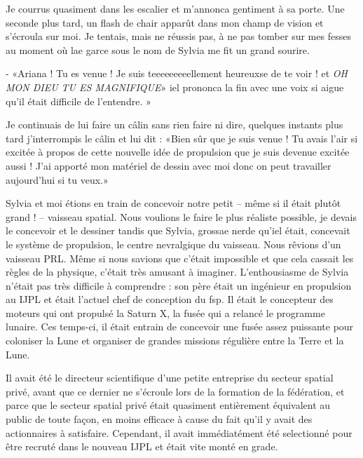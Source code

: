 \documentclass[12pt,hidelinks,a4paper]{book}
\renewcommand{\cdot}{\textbullet}
\begin{document}
\bigskip

Je courrus quasiment dans les escalier et m'annonca gentiment à sa
porte. Une seconde plus tard, un flash de chair apparût dans mon champ
de vision et s'écroula sur moi. Je tentais, mais ne réussis pas, à
ne pas tomber sur mes fesses au moment où lae garce sous le nom de
Sylvia me fit un grand sourire.\par

\bigskip

- «Ariana ! Tu es venue ! Je suis teeeeeeeeellement heureux\cdot se de
te voir ! et \textit{OH MON DIEU TU ES MAGNIFIQUE}» iel prononca
la fin avec une voix si aigue qu'il était difficile de l'entendre.
»

\bigskip

Je continuais de lui faire un câlin sans rien faire ni dire, quelques
instants plus tard j'interrompis le câlin et lui dit : «Bien sûr
que je suis venue ! Tu avais l'air si excité\cdot e à propos de cette nouvelle
idée de propulsion que je suis devenue excitée aussi ! J'ai apporté
mon matériel de dessin avec moi donc on peut travailler aujourd'hui
si tu veux.»

\bigskip

Sylvia et moi étions en train de concevoir notre petit -- même si
il était plutôt grand ! -- vaisseau spatial. Nous voulions le faire
le plus réaliste possible, je devais le concevoir et le dessiner tandis
que Sylvia, grossae nerd\cdot e qu'iel était, concevait le système de propulsion,
le centre nevralgique du vaisseau. Nous rêvions d'un vaisseau PRL.
Même si nous savions que c'était impossible et que cela cassait les
règles de la physique, c'était très amusant à imaginer. L'enthousiasme
de Sylvia n'était pas très difficile à comprendre : son père était
un ingénieur en propulsion au IJPL et était l'actuel chef de conception
du \gls{fsp}. Il était le concepteur des moteurs qui ont propulsé
la Saturn X, la fusée qui a relancé le programme lunaire. Ces temps-ci,
il était entrain de concevoir une fusée assez puissante pour coloniser
la Lune et organiser de grandes missions régulière entre la Terre
et la Lune.

\bigskip

Il avait été le directeur scientifique d'une petite entreprise du
secteur spatial privé, avant que ce dernier ne s'écroule lors de la
formation de la fédération, et parce que le secteur spatial privé
était quasiment entièrement équivalent au public de toute façon, en
moins efficace à cause du fait qu'il y avait des actionnaires à satisfaire.
Cependant, il avait immédiatément été selectionné pour être recruté
dans le nouveau IJPL et était vite monté en grade.
\end{document}
